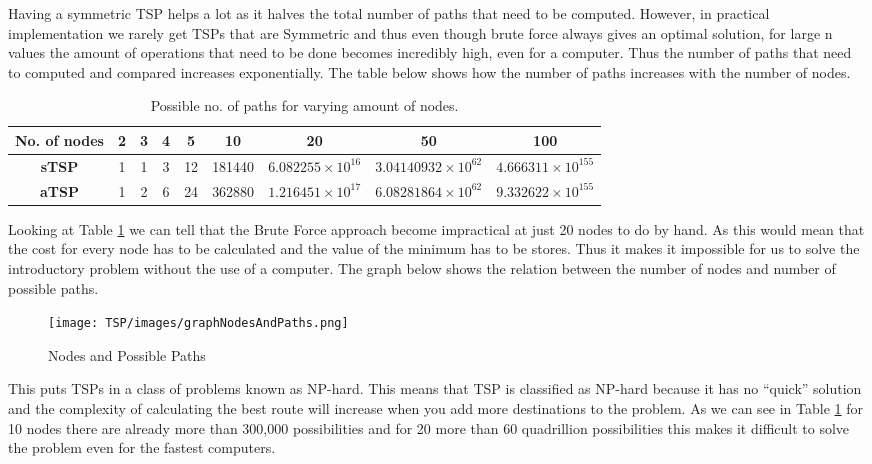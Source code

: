 \documentclass[a4paper]{article}
\begin{document}
Having a symmetric TSP helps a lot as it halves the total number of paths that need to be computed. However, in practical implementation we rarely get TSPs that are Symmetric and thus even though brute force always gives an optimal solution, for large n values the amount of operations that need to be done becomes incredibly high, even for a computer. Thus the number of paths that need to computed and compared increases exponentially. The table below shows how the number of paths increases with the number of nodes.
\begin{table}[H]
    \centering
    \begin{tabular}{|c|cccccccc|}
    \hline
    No. of nodes      &\textbf{2}&\textbf{3}&\textbf{4}&\textbf{5}&\textbf{10}&\textbf{20}&\textbf{50}&\textbf{100}\\
    \hline
    \textbf{sTSP}  & 1 & 1& 3 & 12 & 181440 & $6.082255\times10^{16}$ & $3.04140932\times10^{62}$ & $4.666311\times10^{155}$\\
    \textbf{aTSP}  & 1 &2& 6 & 24 & 362880 & $1.216451\times10^{17}$ & $6.08281864\times10^{62}$ &$9.332622\times10^{155}$\\
    \hline
    \end{tabular}
    \caption{Possible no. of paths for varying amount of nodes.}
    \label{tab:BruteForcePathsNumbers}
\end{table}
Looking at Table \ref{tab:BruteForcePathsNumbers} we can tell that the Brute Force approach become impractical at just 20 nodes to do by hand. As this would mean that the cost for every node has to be calculated and the value of the minimum has to be stores. Thus it makes it impossible for us to solve the introductory problem without the use of a computer. The graph below shows the relation between the number of nodes and number of possible paths. 
\begin{figure}[H]
    \centering
        \texttt{[image: TSP/images/graphNodesAndPaths.png]}
        \caption{Nodes and Possible Paths}
        \label{fig:nodesAndPaths}
\end{figure}


This puts TSPs in a class of problems known as NP-hard. This means that TSP is classified as NP-hard because it has no “quick” solution and the complexity of calculating the best route will increase when you add more destinations to the problem. As we can see in Table \ref{tab:BruteForcePathsNumbers} for 10 nodes there are already more than 300,000 possibilities and for 20 more than 60 quadrillion possibilities this makes it difficult to solve the problem even for the fastest computers.\\
\end{document}
